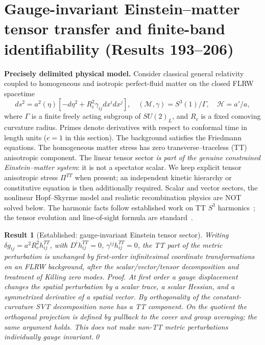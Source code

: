 \documentclass[aps,prd,onecolumn,notitlepage,groupedaddress,11pt]{revtex4-2}
\newtheorem{result}{Result}
\begin{document}
\section{Gauge-invariant Einstein--matter tensor transfer and finite-band identifiability (Results 193--206)}\label{sec:einstein-matter-tensor}
\noindent\textbf{Precisely delimited physical model.} Consider classical general relativity coupled to homogeneous and isotropic perfect-fluid matter on the closed FLRW spacetime
\begin{equation}\label{eq:physical-bg}
 ds^2=a^2(\eta)[-d\eta^2+R_c^2\gamma_{ij}dx^i dx^j],\quad
 (\mathcal M,\gamma)=S^3(1)/\Gamma,\quad \mathcal H=a'/a,
\end{equation}
where $\Gamma$ is a finite freely acting subgroup of $SU(2)_L$, and $R_c$ is a fixed comoving curvature radius. Primes denote derivatives with respect to conformal time in length units ($c=1$ in this section). The background satisfies the Friedmann equations. The homogeneous matter stress has zero transverse--traceless (TT) anisotropic component. The linear tensor sector \emph{is part of the genuine constrained Einstein--matter system}: it is not a spectator scalar. We keep explicit tensor anisotropic stress $\Pi^{TT}$ when present; an independent kinetic hierarchy or constitutive equation is then additionally required. Scalar and vector sectors, the nonlinear Hopf--Skyrme model and realistic recombination physics are NOT solved below. The harmonic facts follow established work on TT $S^3$ harmonics~\cite{Sandberg1978,RubinOrdonez1984,Allen1995,ClosedInflation2022}; the tensor evolution and line-of-sight formula are standard~\cite{GWExact2018,TensorSWReview}.

\begin{result}[\textsf{Established}: gauge-invariant Einstein tensor sector]\label{new:193}
Writing $\delta g_{ij}=a^2R_c^2 h^{TT}_{ij}$, with $D^i h^{TT}_{ij}=0$, $\gamma^{ij}h^{TT}_{ij}=0$, the TT part of the metric perturbation is unchanged by first-order infinitesimal coordinate transformations on an FLRW background, after the scalar/vector/tensor decomposition and treatment of Killing zero modes.
\textit{Proof.} At first order a gauge displacement changes the spatial perturbation by a scalar trace, a scalar Hessian, and a symmetrized derivative of a spatial vector. By orthogonality of the constant-curvature SVT decomposition none has a TT component. On the quotient the orthogonal projection is defined by pullback to the cover and group averaging; the same argument holds. This does not make non-TT metric perturbations individually gauge invariant.\qed
\end{result}
\end{document}
